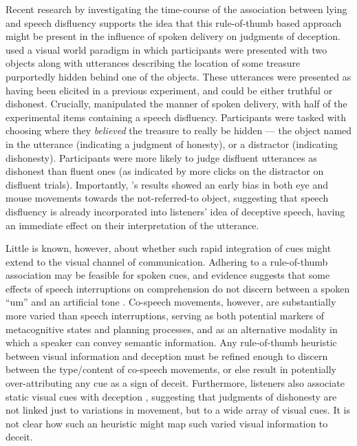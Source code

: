 \documentclass[a4paper,man,natbib]{apa6}
\newcommand*{\spex}[1]{``{#1}''} %
\begin{document}
Recent research by \citet{Loy2017} investigating the time-course of the association between lying and speech disfluency supports the idea that this rule-of-thumb based approach might be present in the influence of spoken delivery on judgments of deception.
\citet{Loy2017} used a visual world paradigm in which participants were presented with two objects along with utterances describing the location of some treasure purportedly hidden behind one of the objects.
These utterances were presented as having been elicited in a previous experiment, and could be either truthful or dishonest.
Crucially, \citet{Loy2017} manipulated the manner of spoken delivery, with half of the experimental items containing a speech disfluency.
Participants were tasked with choosing where they \textit{believed} the treasure to really be hidden --- the object named in the utterance (indicating a judgment of honesty), or a distractor (indicating dishonesty).
Participants were more likely to judge disfluent utterances as dishonest than fluent ones (as indicated by more clicks on the distractor on disfluent trials). 
Importantly, \citeauthor{Loy2017}'s results showed an early bias in both eye and mouse movements towards the not-referred-to object, suggesting that speech disfluency is already incorporated into listeners' idea of deceptive speech, having an immediate effect on their interpretation of the utterance. 

Little is known, however, about whether such rapid integration of cues might extend to the visual channel of communication. 
Adhering to a rule-of-thumb association may be feasible for spoken cues, and evidence suggests that some effects of speech interruptions on comprehension do not discern between a spoken \spex{um} and an artificial tone \citep{Corley2011}.
Co-speech movements, however, are substantially more varied than speech interruptions, serving as both potential markers of metacognitive states and planning processes, and as an alternative modality in which a speaker can convey semantic information.
Any rule-of-thumb heuristic between visual information and deception must be refined enough to discern between the type/content of co-speech movements, or else result in potentially over-attributing any cue as a sign of deceit.
Furthermore, listeners also associate static visual cues with deception \citep[e.g. eye-gaze,][]{Zuckerman1981a}, suggesting that judgments of dishonesty are not linked just to variations in movement, but to a wide array of visual cues.
It is not clear how such an heuristic might map such varied visual information to deceit. 
\end{document}
